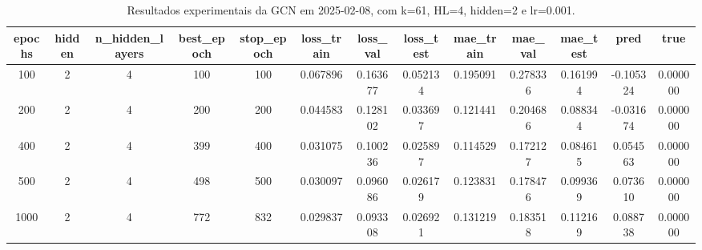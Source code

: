 \begin{table}[h]
\centering
\caption{Resultados experimentais da GCN em 2025-02-08, com k=61, HL=4, hidden=2 e lr=0.001.}
\label{tab:gcn_results_k61_hl4_h2_d20250208}
\begin{tabular}{ccccccccccccc}
\toprule
epochs & hidden & n\_hidden\_layers & best\_epoch & stop\_epoch & loss\_train & loss\_val & loss\_test & mae\_train & mae\_val & mae\_test & pred & true \\
\midrule
100 & 2 & 4 & 100 & 100 & 0.067896 & 0.163677 & 0.052134 & 0.195091 & 0.278336 & 0.161994 & -0.105324 & 0.000000 \\
200 & 2 & 4 & 200 & 200 & 0.044583 & 0.128102 & 0.033697 & 0.121441 & 0.204686 & 0.088344 & -0.031674 & 0.000000 \\
400 & 2 & 4 & 399 & 400 & 0.031075 & 0.100236 & 0.025897 & 0.114529 & 0.172127 & 0.084615 & 0.054563 & 0.000000 \\
500 & 2 & 4 & 498 & 500 & 0.030097 & 0.096086 & 0.026179 & 0.123831 & 0.178476 & 0.099369 & 0.073610 & 0.000000 \\
1000 & 2 & 4 & 772 & 832 & 0.029837 & 0.093308 & 0.026921 & 0.131219 & 0.183518 & 0.112169 & 0.088738 & 0.000000 \\
\bottomrule
\end{tabular}
\end{table}
